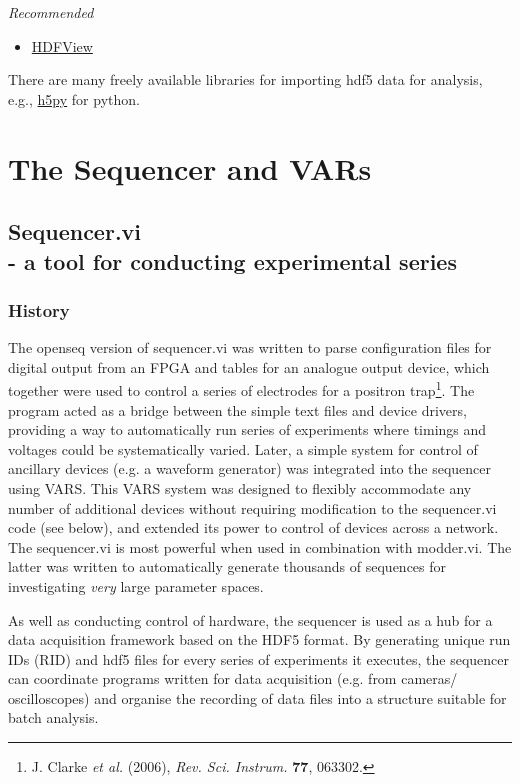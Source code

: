 \documentclass[10pt,a4paper]{article}
\begin{document}
\emph{Recommended}
\begin{itemize}
\item  \href{https://www.hdfgroup.org/products/java/hdfview/}{HDFView}
\end{itemize}

There are many freely available libraries for importing hdf5 data for analysis, e.g., \href{http://www.h5py.org/}{h5py} for python.

\section{The Sequencer and VARs}
\subsection[Sequencer.vi]{\label{sex:seq}Sequencer.vi \\ %
	\normalsize - a tool for conducting experimental series}

\subsubsection{History}
The openseq version of sequencer.vi was written to parse configuration files for digital output from an FPGA and tables for an analogue output device, which together were used to control a series of electrodes for a positron trap\footnote{J. Clarke \emph{et al.} (2006), \emph{Rev. Sci. Instrum.} \textbf{77}, 063302.}.  The program acted as a bridge between the simple text files and device drivers, providing a way to automatically run series of experiments where timings and voltages could be systematically varied. Later, a simple system for control of ancillary devices (e.g. a waveform generator) was integrated into the sequencer using VARS.  This VARS system was designed to flexibly accommodate any number of additional devices without requiring modification to the sequencer.vi code  (see below), and extended its power to control of devices across a network.  The sequencer.vi is most powerful when used in combination with modder.vi.  The latter was written to automatically generate thousands of sequences for investigating \emph{very} large parameter spaces. 

As well as conducting control of hardware, the sequencer is used as a hub for a data acquisition framework based on the HDF5 format.  By generating unique run IDs (RID) and hdf5 files for every series of experiments it executes, the sequencer can coordinate programs written for data acquisition (e.g. from cameras/ oscilloscopes) and organise the recording of data files into a structure suitable for batch analysis.
\end{document}
